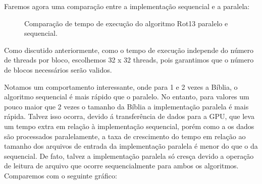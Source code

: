 \documentclass[12pt]{article}
\begin{document}
Faremos agora uma comparação entre a implementação sequencial e a paralela:

\begin{figure}[H]
    \caption{Comparação de tempo de execução do algoritmo Rot13 paralelo
    e sequencial.}
\end{figure}

Como discutido anteriormente, como o tempo de execução independe do
número de threads por bloco, escolhemos 32 x 32 threads, pois
garantimos que o número de blocos necessários serão validos.

Notamos um comportamento interessante, onde para 1 e 2 vezes a Bíblia,
o algoritmo sequencial é mais rápido que o paralelo. No entanto,
para valores um pouco maior que 2 vezes o tamanho da Bíblia a
implementação paralela é mais rápida. Talvez isso ocorra, devido á
transferência de dados para a GPU, que leva um tempo extra em relação à
implementação sequencial, porém como a os dados são processados
paralelamente, a taxa de crescimento do tempo em relação ao tamanho dos
arquivos de entrada da implementação paralela é menor do que o da
sequencial. De fato, talvez a implementação paralela só cresça devido a
operação de leitura de arquivo que ocorre sequencialmente para ambos os
algoritmos. Comparemos com o seguinte gráfico:
\end{document}
